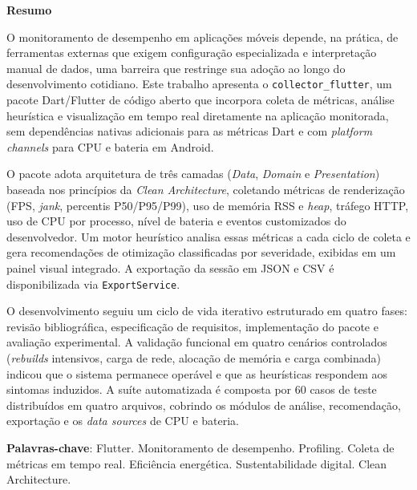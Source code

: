 
\begin{center}
\huge{{\bf Resumo}}
\vspace{2cm}
\end{center}

O monitoramento de desempenho em aplicações móveis depende, na prática, de ferramentas externas que exigem configuração especializada e interpretação manual de dados, uma barreira que restringe sua adoção ao longo do desenvolvimento cotidiano. Este trabalho apresenta o \texttt{collector\_flutter}, um pacote Dart/Flutter de código aberto que incorpora coleta de métricas, análise heurística e visualização em tempo real diretamente na aplicação monitorada, sem dependências nativas adicionais para as métricas Dart e com \textit{platform channels} para CPU e bateria em Android.

O pacote adota arquitetura de três camadas (\textit{Data}, \textit{Domain} e \textit{Presentation}) baseada nos princípios da \textit{Clean Architecture}, coletando métricas de renderização (FPS, \textit{jank}, percentis P50/P95/P99), uso de memória RSS e \textit{heap}, tráfego HTTP, uso de CPU por processo, nível de bateria e eventos customizados do desenvolvedor. Um motor heurístico analisa essas métricas a cada ciclo de coleta e gera recomendações de otimização classificadas por severidade, exibidas em um painel visual integrado. A exportação da sessão em JSON e CSV é disponibilizada via \texttt{ExportService}.

O desenvolvimento seguiu um ciclo de vida iterativo estruturado em quatro fases: revisão bibliográfica, especificação de requisitos, implementação do pacote e avaliação experimental. A validação funcional em quatro cenários controlados (\textit{rebuilds} intensivos, carga de rede, alocação de memória e carga combinada) indicou que o sistema permanece operável e que as heurísticas respondem aos sintomas induzidos. A suíte automatizada é composta por 60 casos de teste distribuídos em quatro arquivos, cobrindo os módulos de análise, recomendação, exportação e os \textit{data sources} de CPU e bateria.

\textbf{Palavras-chave}: Flutter. Monitoramento de desempenho. Profiling. Coleta de métricas em tempo real. Eficiência energética. Sustentabilidade digital. Clean Architecture.


\clearpage
